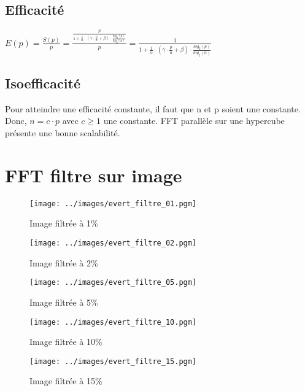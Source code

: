 \documentclass[a4paper]{article}
\begin{document}
\subsection{Efficacité}
\begin{center}
$E(p) = \frac{S(p)}{p} = \frac{\frac{p}{1 + \frac{1}{\alpha} \cdot ( \gamma \cdot \frac{p}{n} + \beta) \cdot \frac{log_2(p)}{log_2(n)}}}{p} = \frac{1}{1 + \frac{1}{\alpha} \cdot ( \gamma \cdot \frac{p}{n} + \beta) \cdot \frac{log_2(p)}{log_2(n)}}$
\end{center}

\subsection{Isoefficacité}
Pour atteindre une efficacité constante, il faut que n et p soient une constante. Donc, $n = c \cdot p $ avec $c \ge 1$ une constante.
FFT parallèle sur une hypercube présente une bonne scalabilité.

\newpage

\section{FFT filtre sur image}

\begin{figure}[!ht]
    \center
    \texttt{[image: ../images/evert\_filtre\_01.pgm]}
    \caption{Image filtrée à 1\%}
\end{figure}

\begin{figure}[!ht]
    \center
    \texttt{[image: ../images/evert\_filtre\_02.pgm]}
    \caption{Image filtrée à 2\%}
\end{figure}

\begin{figure}[!ht]
    \center
    \texttt{[image: ../images/evert\_filtre\_05.pgm]}
    \caption{Image filtrée à 5\%}
\end{figure}

\begin{figure}[!ht]
    \center
    \texttt{[image: ../images/evert\_filtre\_10.pgm]}
    \caption{Image filtrée à 10\%}
\end{figure}

\begin{figure}[!ht]
    \center
    \texttt{[image: ../images/evert\_filtre\_15.pgm]}
    \caption{Image filtrée à 15\%}
\end{figure}
\end{document}
